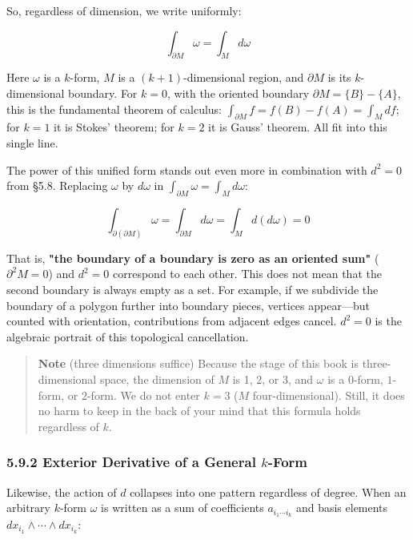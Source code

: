 So, regardless of dimension, we write uniformly:

\[\int_{\partial M} \omega = \int_M d\omega\]

Here \(\omega\) is a \(k\)-form, \(M\) is a \((k+1)\)-dimensional
region, and \(\partial M\) is its \(k\)-dimensional boundary. For
\(k=0\), with the oriented boundary \(\partial M=\{B\}-\{A\}\), this is
the fundamental theorem of calculus:
\(\int_{\partial M} f=f(B)-f(A)=\int_M df\); for \(k=1\) it is Stokes'
theorem; for \(k=2\) it is Gauss' theorem. All fit into this single
line.

The power of this unified form stands out even more in combination with
\(d^2=0\) from §5.8. Replacing \(\omega\) by \(d\omega\) in
\(\int_{\partial M} \omega = \int_M d\omega\):

\[\int_{\partial(\partial M)} \omega = \int_{\partial M} d\omega = \int_M d(d\omega) = 0\]

That is,
\textbf{"the boundary of a boundary is zero as an oriented sum"}
(\(\partial^2 M = 0\)) and \textbf{$d^2=0$} correspond to each other.
This does not mean that the second boundary is always empty as a set.
For example, if we subdivide the boundary of a polygon further into
boundary pieces, vertices appear---but counted with orientation,
contributions from adjacent edges cancel. \(d^2=0\) is the algebraic
portrait of this topological cancellation.

\begin{quote}
\textbf{Note} (three dimensions suffice) Because the stage of this book
is three-dimensional space, the dimension of \(M\) is 1, 2, or 3, and
\(\omega\) is a \(0\)-form, \(1\)-form, or \(2\)-form. We do not enter
\(k=3\) (\(M\) four-dimensional). Still, it does no harm to keep in the
back of your mind that this formula holds regardless of \(k\).
\end{quote}

\hypertarget{exterior-derivative-of-a-general-k-form}{%
\subsubsection{\texorpdfstring{5.9.2 Exterior Derivative of a General
\(k\)-Form}{5.9.2 Exterior Derivative of a General k-Form}}\label{exterior-derivative-of-a-general-k-form}}

Likewise, the action of \(d\) collapses into one pattern regardless of
degree. When an arbitrary \(k\)-form \(\omega\) is written as a sum of
coefficients \(a_{i_1\cdots i_k}\) and basis elements
\(dx_{i_1}\wedge\cdots\wedge dx_{i_k}\):

